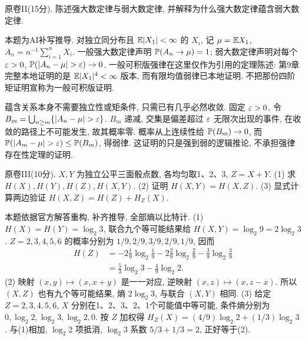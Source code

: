\begin{exercise}\label{ex:flp-II}
原卷II(15分). 陈述强大数定律与弱大数定律, 并解释为什么强大数定律蕴含弱大数定律.
\end{exercise}
\begin{solution}\label{sol:flp-II}
本题为AI补写推导. 对独立同分布且 $\mathbb E|X_1|<\infty$ 的 $X_i$, 记 $\mu=\mathbb E X_1$, $A_n=n^{-1}\sum_{i=1}^nX_i$. 一般强大数定律声明 $\mathbb P(A_n\to\mu)=1$; 弱大数定律声明对每个 $\varepsilon>0$, $\Prob(|A_n-\mu|>\eps)\to0$. 一般可积版强律在这里仅作为引用的定理陈述: 第9章完整本地证明的是 $\mathbb E|X_1|^4<\infty$ 版本, 而有限均值弱律已本地证明. 不把那份四阶矩证明宣称为一般可积版证明.

蕴含关系本身不需要独立性或矩条件, 只需已有几乎必然收敛. 固定 $\varepsilon>0$, 令 $B_m=\bigcup_{n\geq m}\{|A_n-\mu|>\eps\}$. $B_m$ 递减, 交集是偏差超过 $\varepsilon$ 无限次出现的事件, 在收敛的路径上不可能发生, 故其概率零. 概率从上连续性给 $\mathbb P(B_m)\to0$, 而 $\Prob(|A_m-\mu|>\eps)\leq\Prob(B_m)$, 得弱律. 这证明的只是强到弱的逻辑推论, 不承担强律存在性定理的证明.
\end{solution}

\begin{exercise}\label{ex:flp-III}
原卷III(10分). $X,Y$ 为独立公平三面骰点数, 各均匀取1、2、3, $Z=X+Y$. (1) 求 $H(X),H(Y),H(Z),H(X,Y)$. (2) 证明 $H(X,Y)=H(X,Z)$. (3) 显式计算两边验证 $H(X,Z)=H(Z)+H_Z(X)$.
\end{exercise}
\begin{solution}
本题依据官方解答重构, 补齐推导, 全部熵以比特计.
(1)\label{sol:flp-III-1} $H(X)=H(Y)=\log_2 3$, 联合九个等可能结果给 $H(X,Y)=\log_2 9=2\log_2 3$. $Z=2,3,4,5,6$ 的概率分别为 $1/9,2/9,3/9,2/9,1/9$, 因而
\begin{align*}
H(Z)&=-2\frac19\log_2\frac19-2\frac29\log_2\frac29-\frac39\log_2\frac39\\
&=\frac53\log_2 3-\frac49\log_2 2.
\end{align*}
(2)\label{sol:flp-III-2} 映射 $(x,y)\mapsto(x,x+y)$ 是一一对应, 逆映射 $(x,z)\mapsto(x,z-x)$. 所以 $(X,Z)$ 也有九个等可能结果, 熵 $2\log_2 3$, 与联合 $(X,Y)$ 相同.
(3)\label{sol:flp-III-3} 给定 $Z=2,3,4,5,6$, $X$ 分别在1、2、3、2、1个可能值中等可能, 条件熵分别为 $0,\log_2 2,\log_2 3,\log_2 2,0$. 按 $Z$ 加权得
$H_Z(X)=(4/9)\log_2 2+(1/3)\log_2 3$. 与(1)相加, $\log_2 2$ 项抵消, $\log_2 3$ 系数 $5/3+1/3=2$, 正好等于(2).
\end{solution}

